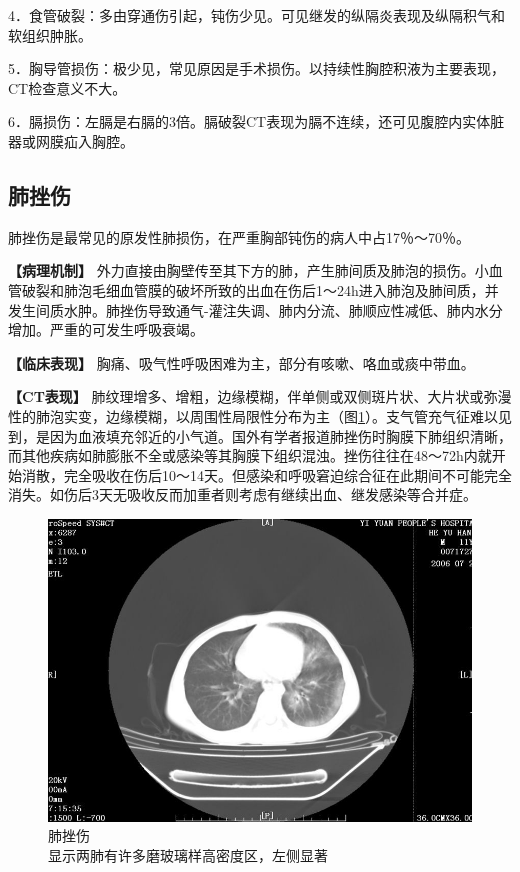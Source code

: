 4．食管破裂：多由穿通伤引起，钝伤少见。可见继发的纵隔炎表现及纵隔积气和软组织肿胀。

5．胸导管损伤：极少见，常见原因是手术损伤。以持续性胸腔积液为主要表现，CT检查意义不大。

6．膈损伤：左膈是右膈的3倍。膈破裂CT表现为膈不连续，还可见腹腔内实体脏器或网膜疝入胸腔。

\subsection{肺挫伤}

肺挫伤是最常见的原发性肺损伤，在严重胸部钝伤的病人中占17％～70％。

\textbf{【病理机制】}
外力直接由胸壁传至其下方的肺，产生肺间质及肺泡的损伤。小血管破裂和肺泡毛细血管膜的破坏所致的出血在伤后1～24h进入肺泡及肺间质，并发生间质水肿。肺挫伤导致通气-灌注失调、肺内分流、肺顺应性减低、肺内水分增加。严重的可发生呼吸衰竭。

\textbf{【临床表现】}
胸痛、吸气性呼吸困难为主，部分有咳嗽、咯血或痰中带血。

\textbf{【CT表现】}
肺纹理增多、增粗，边缘模糊，伴单侧或双侧斑片状、大片状或弥漫性的肺泡实变，边缘模糊，以周围性局限性分布为主（图\ref{fig9-33}）。支气管充气征难以见到，是因为血液填充邻近的小气道。国外有学者报道肺挫伤时胸膜下肺组织清晰，而其他疾病如肺膨胀不全或感染等其胸膜下组织混浊。挫伤往往在48～72h内就开始消散，完全吸收在伤后10～14天。但感染和呼吸窘迫综合征在此期间不可能完全消失。如伤后3天无吸收反而加重者则考虑有继续出血、继发感染等合并症。

\begin{figure}[!htbp]
 \centering
 \includegraphics[width=.7\textwidth,height=\textheight,keepaspectratio]{./images/Image00224.jpg}
 \captionsetup{justification=centering}
 \caption{肺挫伤\\{\small 显示两肺有许多磨玻璃样高密度区，左侧显著}}
 \label{fig9-33}
  \end{figure} 

